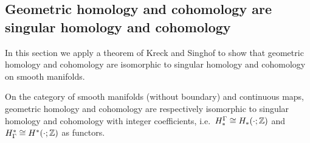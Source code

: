 \subsection{Geometric homology and cohomology are singular homology and cohomology}\label{S: homology is homology}

In this section we apply a theorem of Kreck and Singhof to show that geometric homology and cohomology are isomorphic to singular homology and cohomology on smooth manifolds.

\begin{theorem}\label{T: geometric is singular}
	On the category of smooth manifolds (without boundary) and continuous maps, geometric homology and cohomology are respectively isomorphic to singular homology and cohomology with integer coefficients, i.e.\ $H_*^\Gamma \cong H_*(\cdot ;\mathbb{Z})$ and $H^*_\Gamma \cong H^*(\cdot ;\mathbb{Z})$ as functors.
\end{theorem}

